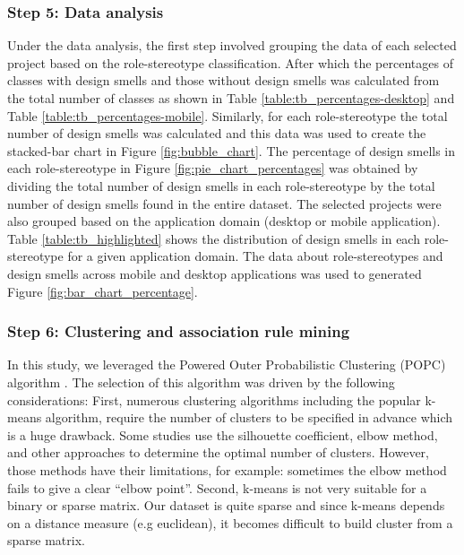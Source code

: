 \documentclass[AMA,Times1COL]{WileyNJDv5} %
\begin{document}
	\subsubsection*{Step 5: Data analysis}
	Under the data analysis, the first step involved grouping the data of each selected project based on the role-stereotype classification. After which the percentages of classes with design smells and those without design smells was calculated from the total number of classes as shown in Table \ref{table:tb_percentages-desktop} and Table \ref{table:tb_percentages-mobile}. 
	Similarly, for each role-stereotype the total number of design smells was calculated and this data was used to create the stacked-bar chart in Figure \ref{fig:bubble_chart}. The percentage of design smells in each role-stereotype in Figure \ref{fig:pie_chart_percentages} was obtained by dividing the total number of design smells in each role-stereotype by the total number of design smells found in the entire dataset. The selected projects were also grouped based on the application domain (desktop or mobile application). Table \ref{table:tb_highlighted} shows the distribution of design smells in each role-stereotype for a given application domain. The data about role-stereotypes and design smells across mobile and desktop applications was used to generated Figure \ref{fig:bar_chart_percentage}.
	
	
	\subsubsection*{Step 6: Clustering and association rule mining}
	In this study, we leveraged the Powered Outer Probabilistic Clustering (POPC) algorithm \cite{taraba2017clustering}. The selection of this algorithm was driven by the following considerations: First, numerous clustering algorithms including the popular k-means algorithm, require the number of clusters to be specified in advance which is a huge drawback. Some studies use the silhouette coefficient, elbow method, and other approaches to determine the optimal number of clusters. However, those methods have their limitations, for example: sometimes the elbow method fails to give a clear ``elbow point”. Second, k-means is not very suitable for a binary or sparse matrix. Our dataset is quite sparse and since k-means depends on a distance measure (e.g euclidean), it becomes difficult to build cluster from a sparse matrix. 
	
\end{document}
